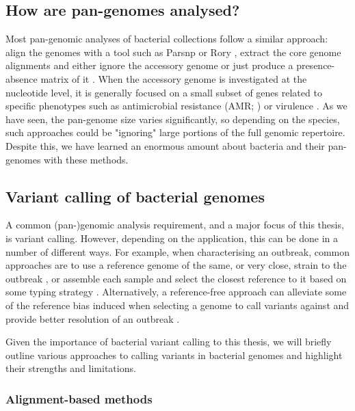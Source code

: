 \subsection{How are pan-genomes analysed?}

Most pan-genomic analyses of bacterial collections follow a similar approach: align the genomes with a tool such as Parsnp \cite{Treangen2014} or Rory \cite{Page2015}, extract the core genome alignments and either ignore the accessory genome or just produce a presence-absence matrix of it \cite{Arnold2018,Azarian2018,McNally2016,thepangenome2020}. When the accessory genome is investigated at the nucleotide level, it is generally focused on a small subset of genes related to specific phenotypes such as antimicrobial resistance (AMR; \cite{Boolchandani2019}) or virulence \cite{Vasquez2019}. As we have seen, the pan-genome size varies significantly, so depending on the species, such approaches could be "ignoring" large portions of the full genomic repertoire. Despite this, we have learned an enormous amount about bacteria and their pan-genomes with these methods.

\subsection{Variant calling of bacterial genomes}
\label{sec:intro-bacteria-var-call}

A common (pan-)genomic analysis requirement, and a major focus of this thesis, is variant calling. However, depending on the application, this can be done in a number of different ways. For example, when characterising an outbreak, common approaches are to use a reference genome of the same, or very close, strain to the outbreak \cite{Taylor2015}, or assemble each sample and select the closest reference to it based on some typing strategy \cite{Wyres2021}. Alternatively, a reference-free approach can alleviate some of the reference bias induced when selecting a genome to call variants against and provide better resolution of an outbreak \cite{Cremers2020}.

Given the importance of bacterial variant calling to this thesis, we will briefly outline various approaches to calling variants in bacterial genomes and highlight their strengths and limitations.

\subsubsection{Alignment-based methods}

